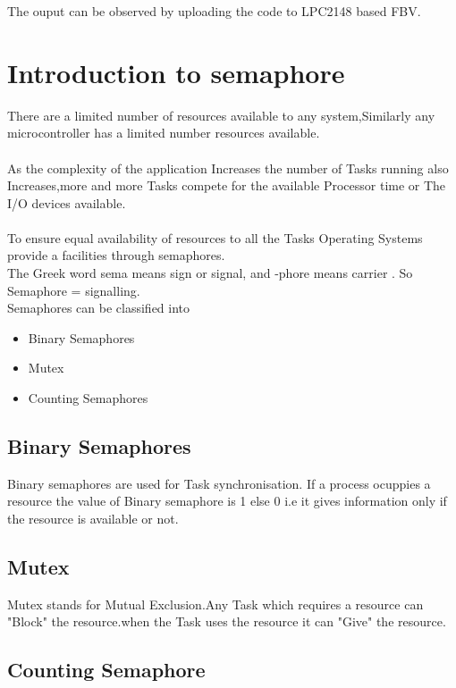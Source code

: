 \documentclass[11pt,a4paper]{book}
\begin{document}
	The ouput can be observed by uploading the code to LPC2148 based FBV.
	  
	  \newpage
	\section{Introduction to semaphore}
	There are a limited number of resources available to any system,Similarly any microcontroller has a limited number  resources available.
	\\ \\
	As the complexity of the application Increases the number of Tasks running also Increases,more and more Tasks compete for the available Processor time or The I/O devices available.
	\\ \\
	To ensure equal availability of resources to all the Tasks Operating Systems provide a facilities through semaphores.
	\\ 
	The Greek word sema means sign or signal, and -phore means carrier . So Semaphore = signalling.
	\\
	Semaphores can be classified into
	\\ 
	\begin{itemize}
	\item Binary Semaphores
	\item Mutex	 
	\item Counting Semaphores
	
	
	\end{itemize}
	\subsection{Binary Semaphores}
	
	Binary semaphores are used for Task synchronisation.
	If a process ocuppies a resource the value of Binary semaphore is 1 else 0 i.e it gives information only if the resource is available or not.
	
	\subsection{Mutex}
	
	Mutex stands for Mutual Exclusion.Any Task which requires a resource can "Block" the resource.when the Task uses the resource it can "Give" the resource.
	
	\subsection{Counting Semaphore}
	
\end{document}
